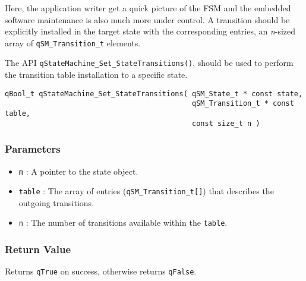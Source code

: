 Here, the application writer get a quick picture of the FSM and the embedded software maintenance is also much more under control. A transition should be explicitly installed in the target state with the corresponding entries, an \textit{n}-sized array of \lstinline{qSM_Transition_t} elements. 

The API \lstinline{qStateMachine_Set_StateTransitions()}, should be used to perform the transition table installation to a specific state.
\medskip

\begin{lstlisting}[style=CStyle]
qBool_t qStateMachine_Set_StateTransitions( qSM_State_t * const state,
                                            qSM_Transition_t * const table,
                                            const size_t n )
\end{lstlisting} 

\subsubsection*{Parameters}
\begin{itemize}
    \item \lstinline{m} : A pointer to the state object. 
    \item \lstinline{table} : The array of entries (\lstinline{qSM_Transition_t[]}) that describes the outgoing transitions. 
    \item \lstinline{n} : The number of transitions available within the \lstinline{table}.
\end{itemize}

\subsubsection*{Return Value}
Returns \lstinline{qTrue} on success, otherwise returns \lstinline{qFalse}.

\hrulefill

